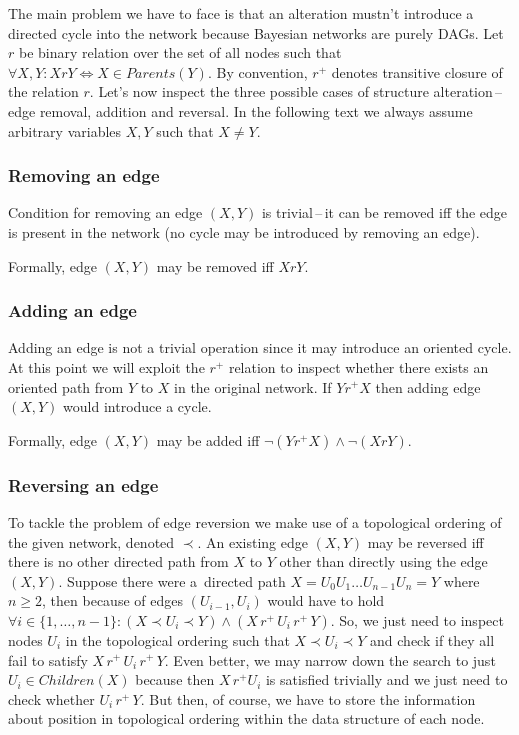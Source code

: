 \documentclass[english,cover]{fitthesis} %
\begin{document}
The main problem we have to face is that an alteration mustn't introduce a directed cycle into the network because Bayesian networks are purely DAGs. Let $r$ be binary relation over the set of all nodes such that $\forall X,Y: XrY \Leftrightarrow X \in Parents(Y)$. By convention, $r^+$ denotes transitive closure of the relation $r$. Let's now inspect the three possible cases of structure alteration\,--\,edge removal, addition and reversal. In the following text we always assume arbitrary variables $X,Y$ such that $X \neq Y$.


\subsubsection{Removing an edge}
Condition for removing an edge $(X,Y)$ is trivial\,--\,it can be removed iff the edge is present in the network (no cycle may be introduced by removing an edge).

Formally, edge $(X,Y)$ may be removed iff $XrY$.


\subsubsection{Adding an edge}
Adding an edge is not a trivial operation since it may introduce an oriented cycle. At this point we will exploit the $r^+$ relation to inspect whether there exists an oriented path from $Y$ to $X$ in the original network. If $Y r^+ X$ then adding edge $(X,Y)$ would introduce a cycle.

Formally, edge $(X,Y)$ may be added iff $\neg(Y r^+ X) \land \neg(X r Y)$.


\subsubsection{Reversing an edge}
To tackle the problem of edge reversion we make use of a topological ordering of the given network, denoted $\prec$. An existing edge $(X,Y)$ may be reversed iff there is no other directed path from $X$ to $Y$ other than directly using the edge $(X,Y)$. Suppose there were a~directed path $X = U_0 U_1 \dots U_{n-1} U_n = Y$ where $n \geq 2$, then because of edges $(U_{i-1}, U_i)$ would have to hold $\forall i \in \lbrace 1,\dots, n-1 \rbrace: (X \prec U_i \prec Y) \land (X \, r^+ \, U_i \, r^+ \, Y)$. So, we just need to inspect nodes $U_i$ in the topological ordering such that $X \prec U_i \prec Y$ and check if they all fail to satisfy $X \, r^+ \, U_i \, r^+ \, Y$. Even better, we may narrow down the search to just $U_i \in Children(X)$ because then $X \, r^+ U_i$ is satisfied trivially and we just need to check whether $U_i \, r^+ \, Y$. But then, of course, we have to store the information about position in topological ordering within the data structure of each node.
\end{document}
